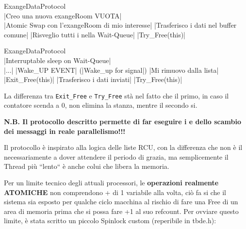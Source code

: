 \begin{small}\begin{minipage}{0.45\linewidth}%
\begin{fminipage}{\linewidth}
\begin{program}
\mbox{\Writer ExangeDataProtocol}
\BEGIN \\
  |Creo una nuova exangeRoom VUOTA| \\
  |Atomic Swap con l'exangeRoom di mio interesse|
  |Trasferisco i dati nel buffer comune|
  |Risveglio tutti i \Reader nella Wait-Queue|
  |Try_Free(this)|
\END
\end{program}
\end{fminipage}
\end{minipage}%
\begin{minipage}{0.10\linewidth}%
\hfill%
\end{minipage}%
\begin{minipage}{0.45\linewidth}%
\begin{fminipage}{\linewidth}
\begin{program}
\mbox{\Reader ExangeDataProtocol}
\BEGIN \\
  |Interruptable sleep on Wait-Queue| \\
  |...|
  |Wake_UP EVENT|
  \IF(|Wake_up for signal|)
    |Mi rimuovo dalla lista|
    |Exit_Free(this)|
    \EXIT
  \ELSE
    |Trasferisco i dati inviati|
    |Try_Free(this)|
    \EXIT
  \FI
\END
\end{program}
\end{fminipage}
\end{minipage}\end{small}

La differenza tra \verb|Exit_Free| e \verb|Try_Free| stà nel fatto che il primo, in caso il contatore scenda a 0, non
elimina la stanza, mentre il secondo si.

\textbf{N.B. Il protocollo descritto permette di far eseguire i \Writer e \Reader dello scambio dei messaggi in reale
parallelismo!!!}

Il protocollo è inspirato alla logica delle liste RCU, con la differenza che non è il \Writer necessariamente a dover
attendere il periodo di grazia, ma semplicemente il Thread più ``lento`` è anche colui che libera la memoria.

Per un limite tecnico degli attuali processori, le \textbf{operazioni realmente ATOMICHE} non comprendono + di 1
variabile alla volta, ciò fa si che il sistema sia esposto per qualche ciclo macchina al rischio di fare una Free di un
area di memoria prima che si possa fare +1 al suo refcount. Per ovviare questo limite, è stata scritto un piccolo
Spinlock custom (reperibile in tbde.h):

